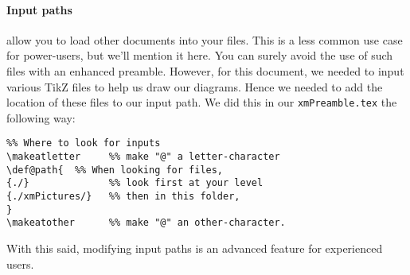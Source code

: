 \documentclass{ximera}
\begin{document}
\paragraph{Input paths} allow you to load other documents into your files.
This is a less common use case for power-users, but we'll mention it here. You can surely avoid
the use of such files with an enhanced preamble. However, for this document, we
needed to input various TikZ files to help us draw our diagrams. Hence we
needed to
add the location of these files to our input path. We did this in our \verb!xmPreamble.tex!
the following way:
\begin{verbatim}
%% Where to look for inputs
\makeatletter     %% make "@" a letter-character
\def@path{  %% When looking for files,
{./}              %% look first at your level
{./xmPictures/}   %% then in this folder,
}
\makeatother      %% make "@" an other-character.
\end{verbatim}
With this said, modifying input paths is an advanced feature for experienced users.
\end{document}
